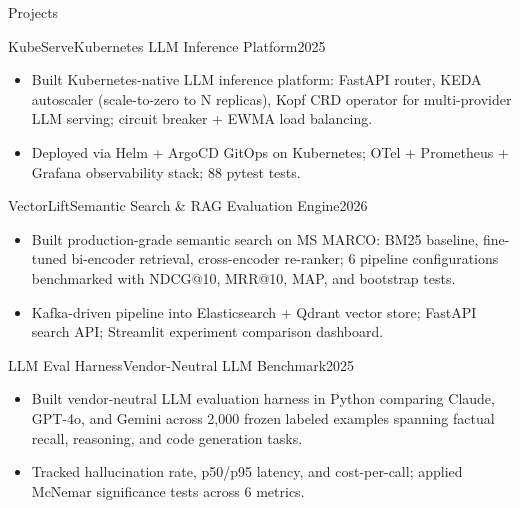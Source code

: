 \documentclass[]{mcdowellcv}
\begin{document}
\begin{cvsection}{Projects}
  \begin{cvsubsection}{KubeServe}{Kubernetes LLM Inference Platform}{2025}
    \begin{itemize}
      \item Built Kubernetes-native LLM inference platform: FastAPI router, KEDA autoscaler (scale-to-zero to N replicas), Kopf CRD operator for multi-provider LLM serving; circuit breaker + EWMA load balancing.
      \item Deployed via Helm + ArgoCD GitOps on Kubernetes; OTel + Prometheus + Grafana observability stack; 88 pytest tests.
    \end{itemize}
    \vspace{-1.5pt}
  \end{cvsubsection}

  \begin{cvsubsection}{VectorLift}{Semantic Search \& RAG Evaluation Engine}{2026}
    \begin{itemize}
      \item Built production-grade semantic search on MS MARCO: BM25 baseline, fine-tuned bi-encoder retrieval, cross-encoder re-ranker; 6 pipeline configurations benchmarked with NDCG@10, MRR@10, MAP, and bootstrap tests.
      \item Kafka-driven pipeline into Elasticsearch + Qdrant vector store; FastAPI search API; Streamlit experiment comparison dashboard.
    \end{itemize}
    \vspace{-1.5pt}
  \end{cvsubsection}

  \begin{cvsubsection}{LLM Eval Harness}{Vendor-Neutral LLM Benchmark}{2025}
    \begin{itemize}
      \item Built vendor-neutral LLM evaluation harness in Python comparing Claude, GPT-4o, and Gemini across 2,000 frozen labeled examples spanning factual recall, reasoning, and code generation tasks.
      \item Tracked hallucination rate, p50/p95 latency, and cost-per-call; applied McNemar significance tests across 6 metrics.
    \end{itemize}
    \vspace{-1.5pt}
  \end{cvsubsection}
\end{cvsection}
\end{document}
